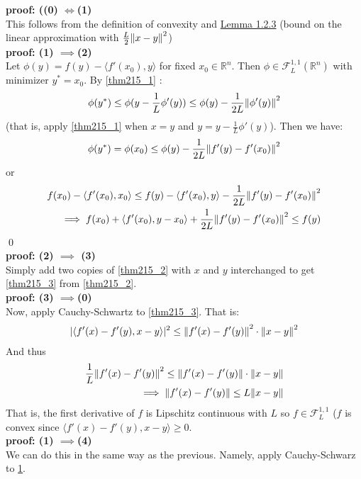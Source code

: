\documentclass[12pt,a4paper]{article}
\begin{document}
	\textbf{proof: ((0) $\iff$(1)} \\This follows from the definition of convexity and \hyperref[lem123]{Lemma 1.2.3} (bound on the linear approximation with $\frac{L}{2}\norm{x - y}^2$)\\
	\textbf{proof: (1) $\implies $(2)}\\ Let $\phi(y) = f(y) - \langle f'(x_0), y \rangle$ for fixed $x_0 \in \mathbb{R}^n$. Then $\phi \in \mathcal{F}_L^{1,1}(\mathbb{R}^n)$ with minimizer $y^* = x_0$. By \ref{thm215_1} :
	\begin{align*}
		\phi(y^*) \leq \phi(y - \frac{1}{L}\phi '(y)) \leq \phi(y) - \frac{1}{2L}\norm{\phi'(y)}^2
	\end{align*}
	(that is, apply \ref{thm215_1} when $x = y$ and $y = y - \frac{1}{L}\phi ' (y)$). Then we have:
	\begin{align*}
		\phi(y^*) = \phi(x_0) \leq \phi(y) - \frac{1}{2L}\norm{f'(y) - f'(x_0)}^2
	\end{align*}
	or
	\begin{align*}
		f(x_0) - \langle f'(x_0),x_0 \rangle  \leq f(y) - \langle f'(x_0), y \rangle - \frac{1}{2L}\norm{f'(y) - f'(x_0)}^2 \\
		\implies f(x_0) + \langle f'(x_0), y - x_0 \rangle + \frac{1}{2L}\norm{f'(y) - f'(x_0)}^2 \leq f(y)
	\end{align*}
	\qed \\
	\textbf{proof: (2) $\implies$ (3)}\\ Simply add two copies of \ref{thm215_2} with $x$ and $y$ interchanged to get \ref{thm215_3} from \ref{thm215_2}. \\
	\textbf{proof: (3) $\implies $(0)}\\
	Now, apply Cauchy-Schwartz to \ref{thm215_3}. That is:
	\begin{align*}
		| \langle f'(x) - f'(y), x - y \rangle |^2 \leq \norm{f'(x) - f'(y)}^2 \cdot \norm{x - y}^2  
	\end{align*} 
	And thus
	\begin{align*}
		\frac{1}{L}\norm{f'(x) - f'(y)}^2 \leq \norm{f'(x) - f'(y)} \cdot \norm{x - y} \\
		\implies \norm{f'(x) - f'(y)}\leq L\norm{x - y}
	\end{align*}
	That is, the first derivative of $f$ is Lipschitz continuous with $L$ so $f \in \mathcal{F}_L^{1,1}$ ($f$ is convex since $\langle f'(x) - f'(y), x - y \rangle \geq 0$.\\
	\textbf{proof: (1) $\implies$(4) }\\
	We can do this in the same way as the previous. Namely, apply Cauchy-Schwarz to \hyperref[thm215_1]{1}. \\
\end{document}
